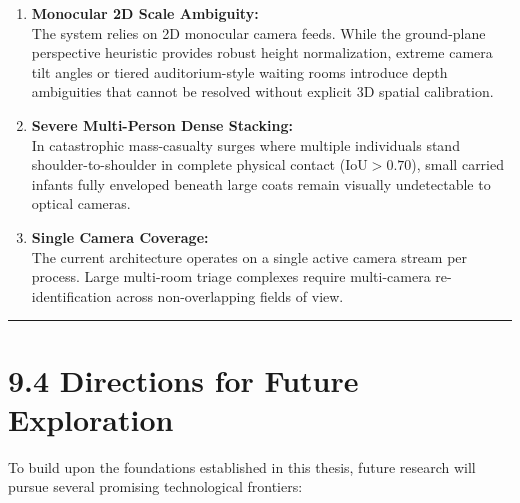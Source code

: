 \begin{enumerate}
\def\labelenumi{\arabic{enumi}.}
\tightlist
\item
  \textbf{Monocular 2D Scale Ambiguity:}\\
  The system relies on 2D monocular camera feeds. While the ground-plane
  perspective heuristic provides robust height normalization, extreme
  camera tilt angles or tiered auditorium-style waiting rooms introduce
  depth ambiguities that cannot be resolved without explicit 3D spatial
  calibration.
\item
  \textbf{Severe Multi-Person Dense Stacking:}\\
  In catastrophic mass-casualty surges where multiple individuals stand
  shoulder-to-shoulder in complete physical contact
  (\(\text{IoU} > 0.70\)), small carried infants fully enveloped beneath
  large coats remain visually undetectable to optical cameras.
\item
  \textbf{Single Camera Coverage:}\\
  The current architecture operates on a single active camera stream per
  process. Large multi-room triage complexes require multi-camera
  re-identification across non-overlapping fields of view.
\end{enumerate}

\begin{center}\rule{0.5\linewidth}{0.5pt}\end{center}

\section{9.4 Directions for Future
Exploration}\label{directions-for-future-exploration}

To build upon the foundations established in this thesis, future
research will pursue several promising technological frontiers:

